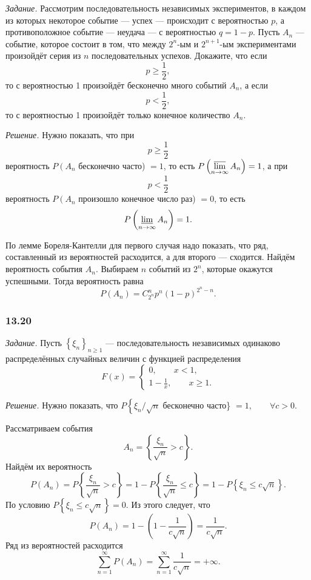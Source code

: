 \textit{Задание.}
Рассмотрим последовательность независимых экспериментов,
в каждом из которых некоторое событие --- успех --- происходит с вероятностью $p$, а противоположное событие --- неудача --- с вероятностью $q = 1 - p$.
Пусть $A_n$ --- событие, которое состоит в том, что между $2^n$-ым и $2^{n+1}$-ым экспериментами произойдёт серия из $n$ последовательных успехов.
Докажите, что если
$$p \geq \frac{1}{2},$$
то с вероятностью 1 произойдёт бесконечно много событий $A_n$, а если
$$p < \frac{1}{2},$$
то с вероятностью 1 произойдёт только конечное количество $A_n$.

\textit{Решение.} Нужно показать, что при
$$p \geq \frac{1}{2}$$
вероятность $P \left( A_n \right.$ бесконечно часто) $= 1$, то есть $P \left( \varlimsup \limits_{n \to \infty } A_n \right) = 1$, а при
$$p < \frac{1}{2}$$
вероятность $P \left( A_n \right.$ произошло конечное число раз) $= 0$, то есть
$$P \left( \varliminf \limits_{n \to \infty } A_n \right) = 1.$$

По лемме Бореля-Кантелли для первого случая надо показать, что ряд, составленный из вероятностей расходится, а для второго --- сходится.
Найдём вероятность события $A_n$.
Выбираем $n$ событий из $2^n$, которые окажутся успешными.
Тогда вероятность равна
$$P \left( A_n \right) =
C_{2^n}^n p^n \left( 1 - p \right)^{2^n-n}.$$

\subsubsection*{13.20}

\textit{Задание.} Пусть $ \left\{ \xi_n \right\}_{n \geq 1}$ --- последовательность независимых одинаково распределённых случайных величин с функцией распределения
$$F \left( x \right) =
\begin{cases}
0, \qquad x < 1, \\
1 - \frac{1}{x}, \qquad x \geq 1.
\end{cases}$$
 
\textit{Решение.} Нужно показать, что $P \left\{ \xi_n/ \sqrt{n} \right.$ бесконечно часто\} $= 1, \qquad \forall c > 0$.

Рассматриваем события
$$A_n =
\left\{ \frac{ \xi_n}{ \sqrt{n}} > c \right\}.$$
Найдём их вероятность
$$P \left( A_n \right) =
P \left\{ \frac{ \xi_n}{ \sqrt{n}} > c \right\} =
1 - P \left\{ \frac{ \xi_n}{ \sqrt{n}} \leq c \right\} =
1 - P \left\{ \xi_n \leq c \sqrt{n} \right\}.$$
По условию $P \left\{ \xi_n \leq c \sqrt{n} \right\} = 0$.
Из этого следует, что
$$P \left( A_n \right) =
1 - \left( 1 - \frac{1}{c \sqrt{n}} \right) =
\frac{1}{c \sqrt{n}}.$$
Ряд из вероятностей расходится
$$ \sum \limits_{n=1}^{ \infty }P \left( A_n \right) =
\sum \limits_{n=1}^{ \infty } \frac{1}{c \sqrt{n}} =
+ \infty.$$

